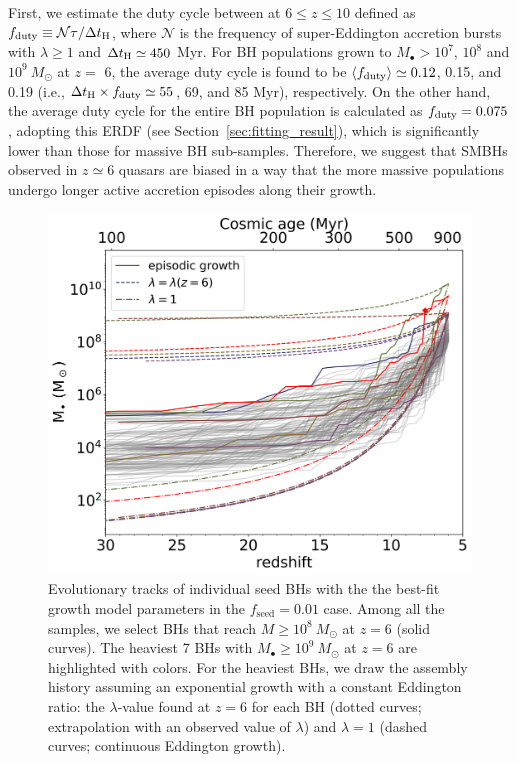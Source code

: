\documentclass[twocolumn, twocolappendix]{aastex63}
\newcommand{\Msun}{M_\odot}
\newcommand{\tlife}{\tau}
\newcommand{\fseed}{f_\mathrm{seed}}
\begin{document}
\begin{CJK*}{UTF8}{gbsn}
First, we estimate the duty cycle between at $6\leq z\leq 10$ defined as $f_{\rm duty} \equiv \mathcal{N}\tlife/\Delta t_{\rm H}$, 
where $\mathcal{N}$ is the frequency of super-Eddington accretion bursts with $\lambda \geq 1$ and $\Delta t_{\rm H}\simeq 450$ Myr.
For BH populations grown to $M_\bullet>10^7$, $10^8$ and $10^9~\Msun$ at $z=$ 6,
the average duty cycle is found to be $\langle f_{\rm duty}\rangle \simeq 0.12$, 0.15, and 0.19
(i.e., $\Delta t_{\rm H} \times f_{\rm duty} \simeq 55$, 69, and 85 Myr), respectively.
On the other hand, the average duty cycle for the entire BH population is calculated as $f_{\rm duty}= 0.075$,
adopting this ERDF (see Section~\ref{sec:fitting_result}), which is significantly lower than those for massive BH sub-samples.
Therefore, we suggest that SMBHs observed in $z\simeq 6$ quasars are biased in a way that
the more massive populations undergo longer active accretion episodes along their growth.


\begin{figure}
\centering
\includegraphics[width=125mm]{Mevol.png}
\caption{
Evolutionary tracks of individual seed BHs with the the best-fit growth model parameters in the $\fseed=0.01$ case.
Among all the samples, we select BHs that reach $M\geq 10^8~\Msun$ at $z=6$ (solid curves). 
The heaviest 7 BHs with $M_\bullet \geq 10^9~\Msun$ at $z=6$ are highlighted with colors. 
For the heaviest BHs, we draw the assembly history assuming an exponential growth with a constant Eddington ratio: 
the $\lambda$-value found at $z=6$ for each BH (dotted curves; extrapolation with an observed value of $\lambda$) and 
$\lambda =1$ (dashed curves; continuous Eddington growth).
}
\label{fig:Mevol}
\end{figure}
%
%



\end{CJK*}
\end{document}
